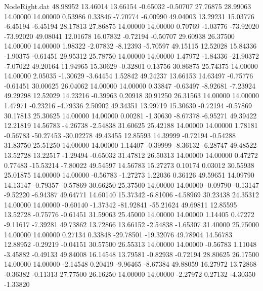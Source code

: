 \begin{filecontents}{NodeRight.dat}
  48.98952   13.46014   13.66154    -0.65032   -0.50707   27.76875   28.99063   14.00000   14.00000    0.53986    0.33846   -7.70774   -6.00990
  49.04003   13.29231   15.03776    -6.45194   -6.45194   28.17813   27.86875   14.00000   14.00000    0.70769   -1.03776  -73.92020  -73.92020
  49.08041   12.01678   16.07832    -0.72194   -0.50707   29.60938   26.37500   14.00000   14.00000    1.98322   -2.07832   -8.12393   -5.70597
  49.15115   12.52028   15.84336    -1.90375   -0.61451   29.95312   25.78750   14.00000   14.00000    1.47972   -1.84336  -21.90372   -7.07022
  49.20164   11.94965   15.30629    -0.32801    0.13756   30.86875   25.74375   14.00000   14.00000    2.05035   -1.30629   -3.64454    1.52842
  49.24237   13.66153   14.63497    -0.75776   -0.61451   30.00625   26.04062   14.00000   14.00000    0.33847   -0.63497   -8.92681   -7.23924
  49.29298   12.52029   14.23216    -0.39963    0.20918   30.91250   26.31563   14.00000   14.00000    1.47971   -0.23216   -4.79336    2.50902
  49.34351   13.99719   15.30630    -0.72194   -0.57869   30.17813   25.30625   14.00000   14.00000    0.00281   -1.30630   -8.67378   -6.95271
  49.39422   12.21819   14.56783    -4.26738   -2.54838   31.60625   25.42188   14.00000   14.00000    1.78181   -0.56783  -50.27453  -30.02278
  49.43455   12.85593   14.39999    -0.72194   -0.54288   31.83750   25.51250   14.00000   14.00000    1.14407   -0.39999   -8.36132   -6.28747
  49.48522   13.52728   13.22517    -1.29494   -0.65032   31.47812   26.50313   14.00000   14.00000    0.47272    0.77483  -15.53214   -7.80022
  49.54597   14.56783   15.27273     0.10174    0.03012   30.55938   25.01875   14.00000   14.00000   -0.56783   -1.27273    1.22036    0.36126
  49.59651   14.09790   14.13147    -0.79357   -0.57869   30.66250   25.37500   14.00000   14.00000   -0.09790   -0.13147   -9.52220   -6.94387
  49.64771   14.60140   15.37342    -6.81006   -4.58969   30.23438   24.35312   14.00000   14.00000   -0.60140   -1.37342  -81.92841  -55.21624
  49.69811   12.85595   13.52728    -0.75776   -0.61451   31.59063   25.45000   14.00000   14.00000    1.14405    0.47272   -9.11617   -7.39281
  49.73862   13.72866   13.66152    -2.54838   -1.65307   31.40000   25.75000   14.00000   14.00000    0.27134    0.33848  -29.78501  -19.32076
  49.78904   14.56783   12.88952    -0.29219   -0.04151   30.57500   26.55313   14.00000   14.00000   -0.56783    1.11048   -3.45882   -0.49133
  49.84008   16.14548   13.79581    -0.82938   -0.72194   28.80625   26.17500   14.00000   14.00000   -2.14548    0.20419   -9.96465   -8.67384
  49.88059   16.27972   13.72868    -0.36382   -0.11313   27.77500   26.16250   14.00000   14.00000   -2.27972    0.27132   -4.30350   -1.33820

\end{filecontents}

